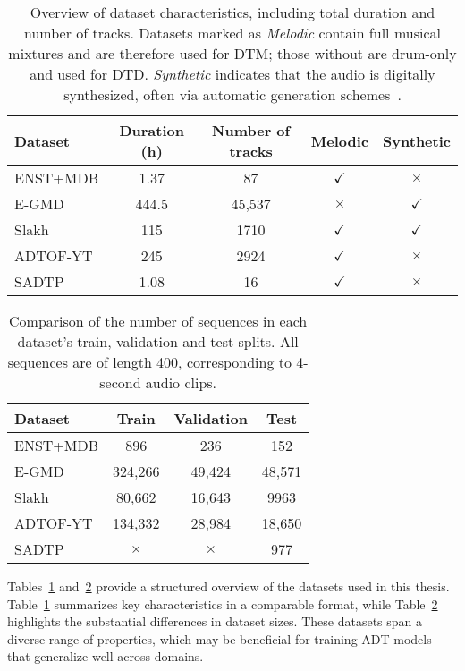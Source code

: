 \begin{table}[H]
    \centering
    \hspace*{-0.6cm}
    \begin{tabular}{l|cccc}
        Dataset & Duration (h) & Number of tracks & Melodic & Synthetic \\
        \hline
        ENST+MDB & 1.37 & 87 & $\checkmark$ & $\times$ \\
        E-GMD & 444.5 & 45,537 & $\times$ & $\checkmark$ \\
        Slakh & 115 & 1710 & $\checkmark$ & $\checkmark$ \\
        ADTOF-YT & 245 & 2924 & $\checkmark$ & $\times$ \\
        SADTP & 1.08 & 16 & $\checkmark$ & $\times$ \\
    \end{tabular}
    \caption{Overview of dataset characteristics, including total duration and number of tracks. Datasets marked as \textit{Melodic} contain full musical mixtures and are therefore used for \gls{DTM}; those without are drum-only and used for \gls{DTD}. \textit{Synthetic} indicates that the audio is digitally synthesized, often via automatic generation schemes~\cite{zehren2024analyzingreducingsynthetictorealtransfer}.}
    \label{DatasetSummaryTable}
\end{table}

\begin{table}[H]
    \centering
    \hspace*{-0.6cm}
    \begin{tabular}{l|ccc}
        Dataset & Train & Validation & Test \\
        \hline
        ENST+MDB & 896 & 236 & 152 \\
        E-GMD & 324,266 & 49,424 & 48,571 \\
        Slakh & 80,662 & 16,643 & 9963 \\
        ADTOF-YT & 134,332 & 28,984 & 18,650 \\
        SADTP & $\times$ & $\times$ & 977 \\
    \end{tabular}
    \caption{Comparison of the number of sequences in each dataset's train, validation and test splits. All sequences are of length 400, corresponding to 4-second audio clips.}
    \label{DatasetSplitSummaryTable}
\end{table}

Tables~\ref{DatasetSummaryTable} and~\ref{DatasetSplitSummaryTable} provide a structured overview of the datasets used in this thesis. Table~\ref{DatasetSummaryTable} summarizes key characteristics in a comparable format, while Table~\ref{DatasetSplitSummaryTable} highlights the substantial differences in dataset sizes. These datasets span a diverse range of properties, which may be beneficial for training \gls{ADT} models that generalize well across domains.